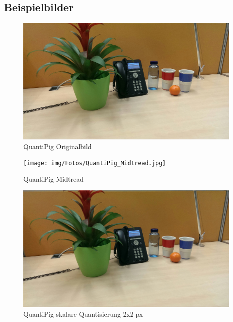 \subsection{Beispielbilder}
\begin{landscape}


\begin{figure}[h]
	\centering
		\includegraphics[width=1.4\textwidth]{img/Fotos/QuantiPig_Original.jpg}
	\caption[QuantiPig Originalbild]{QuantiPig Originalbild}
	\label{fig:pig_original}
\end{figure}

\begin{figure}[h]
	\centering
		\texttt{[image: img/Fotos/QuantiPig\_Midtread.jpg]}
	\caption[QuantiPig Midtread]{QuantiPig Midtread}
	\label{fig:pig_midtread}
\end{figure}

\begin{figure}[h]
	\centering
		\includegraphics[width=1.4\textwidth]{img/Fotos/QuantiPig_Skalar_2x2.jpg}
	\caption[QuantiPig skalare Quantisierung 2x2 p]{QuantiPig skalare Quantisierung 2x2 px}
	\label{fig:pig_skalar 2x2}
\end{figure}


\end{landscape}

